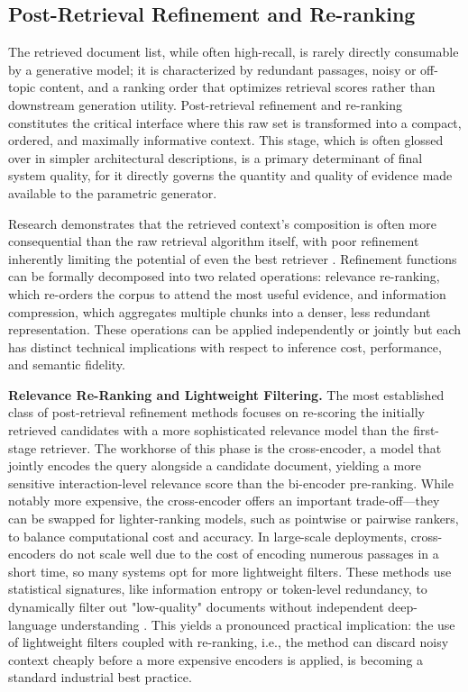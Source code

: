 \documentclass[11pt,a4paper]{article}
\begin{document}
\subsection{Post-Retrieval Refinement and Re-ranking}


The retrieved document list, while often high-recall, is rarely directly consumable by a generative model; it is characterized by redundant passages, noisy or off-topic content, and a ranking order that optimizes retrieval scores rather than downstream generation utility. Post-retrieval refinement and re-ranking constitutes the critical interface where this raw set is transformed into a compact, ordered, and maximally informative context. This stage, which is often glossed over in simpler architectural descriptions, is a primary determinant of final system quality, for it directly governs the quantity and quality of evidence made available to the parametric generator.

Research demonstrates that the retrieved context's composition is often more consequential than the raw retrieval algorithm itself, with poor refinement inherently limiting the potential of even the best retriever \cite{arxiv:2404.10981v1}. Refinement functions can be formally decomposed into two related operations: relevance re-ranking, which re-orders the corpus to attend the most useful evidence, and information compression, which aggregates multiple chunks into a denser, less redundant representation. These operations can be applied independently or jointly but each has distinct technical implications with respect to inference cost, performance, and semantic fidelity.

\textbf{Relevance Re-Ranking and Lightweight Filtering.} The most established class of post-retrieval refinement methods focuses on re-scoring the initially retrieved candidates with a more sophisticated relevance model than the first-stage retriever. The workhorse of this phase is the cross-encoder, a model that jointly encodes the query alongside a candidate document, yielding a more sensitive interaction-level relevance score than the bi-encoder pre-ranking. While notably more expensive, the cross-encoder offers an important trade-off---they can be swapped for lighter-ranking models, such as pointwise or pairwise rankers, to balance computational cost and accuracy. In large-scale deployments, cross-encoders do not scale well due to the cost of encoding numerous passages in a short time, so many systems opt for more lightweight filters. These methods use statistical signatures, like information entropy or token-level redundancy, to dynamically filter out "low-quality" documents without independent deep-language understanding \cite{arxiv:2504.19754v1}. This yields a pronounced practical implication: the use of lightweight filters coupled with re-ranking, i.e., the method can discard noisy context cheaply before a more expensive encoders is applied, is becoming a standard industrial best practice.
\end{document}
